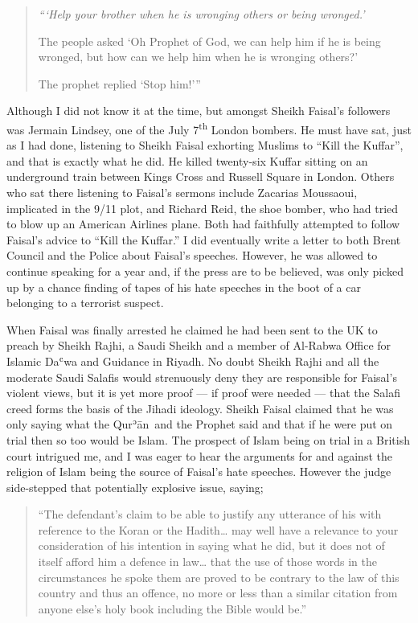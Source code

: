 \documentclass[12pt]{memoir}
\def\´{ʾ} %
\def\`{ʿ} %
\let \Sup=\textsuperscript
\newcommand{\cor}[2]{#2} %
\def \Quran{Qur\-\´ān} %
\begin{document}
\begin{quote}
\itshape
“‘Help your brother when he is wronging others or being wronged.’

The people asked ‘Oh Prophet of God, we can help him if he is being wronged,
but how can we help him when he is wronging others?’

The prophet replied ‘Stop him!’”
\end{quote}

Although I did not know it at the time,
but amongst Sheikh Faisal’s followers was Jermain Lindsey,
one of the July 7\Sup{th} London bombers.
He must have sat, just as I had done, listening to Sheikh Faisal
exhorting Muslims to “Kill the Kuffar”, and that is exactly what he did.
He killed twenty-six Kuffar sitting on an underground train
between Kings Cross and Russell Square in London.
Others who sat there listening to Faisal’s sermons include Zacarias Moussaoui,
implicated in the 9/11 plot, and Richard Reid, the shoe bomber,
who had tried to blow up an American Airlines plane.
Both had faithfully attempted to follow Faisal’s advice to “Kill the Kuffar.”
I did eventually write a letter to both Brent Council
and the Police about Faisal’s speeches.
However, he was allowed to continue speaking for a year and,
if the press are to be believed,
was only picked up by a chance finding of \cor{tapesof}{tapes of}
his hate speeches in the boot of a car belonging to a terrorist suspect.

When Faisal was finally arrested he claimed he had been sent to the UK
to preach by Sheikh Rajhi, a Saudi Sheikh and a member of Al-Rabwa Office
for Islamic Da\`wa and Guidance in Riyadh.
No doubt Sheikh Rajhi and all the moderate Saudi Salafis
would strenuously deny they are responsible for Faisal’s violent views,
but it is yet more proof — if proof were needed —
that the Salafi creed forms the basis of the Jihadi ideology.
Sheikh Faisal claimed that he was only saying what the \Quran\
and the Prophet said and that if he were put on \cor{trail}{trial}
then so too would be Islam.
The prospect of Islam being on trial in a British court intrigued me,
and I was eager to hear the arguments for and against the religion of Islam
being the source of Faisal’s hate speeches.
However the judge side-stepped that potentially explosive issue, saying;

\begin{quote}
“The defendant’s claim \cor{to be}{} to be able to justify any utterance
of his with reference to the Koran or the Hadith…
may well have a relevance to your consideration of his intention
in saying what he did, but it does not of itself afford him a defence in law…
that the use of those words in the circumstances he spoke them
are proved to be contrary to the law of this country and thus an offence,
no more or less than a similar citation from anyone else’s holy book
including the Bible would be.”
\end{quote}
\end{document}
